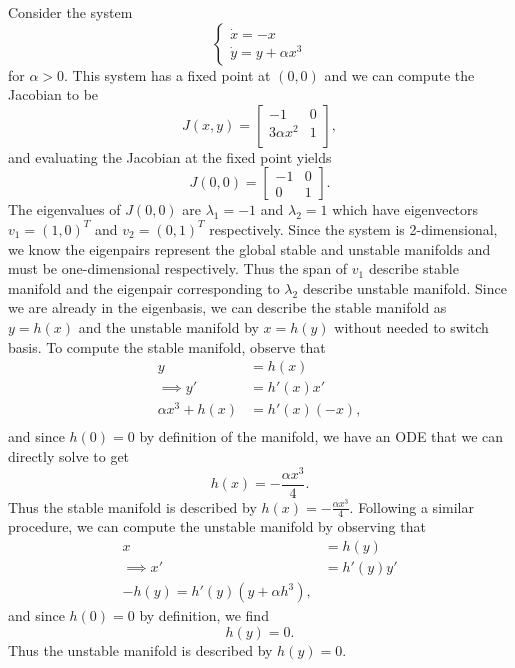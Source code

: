 \documentclass[12pt]{report}
\begin{document}
\begin{solution}

    \noindent
    Consider the system 
    \begin{equation}
        \left\{\begin{array}{l}
        \dot x= -x \\
        \dot y = y + \alpha x^3 
        \end{array}\right.
    \end{equation}
    for $\alpha>0$. This system has a fixed point at $(0,0)$ and we can compute the Jacobian to be
    \[ 
        J(x,y) = \begin{bmatrix}
            -1 & 0\\
            3\alpha x^2 & 1\\
        \end{bmatrix},
    \]
    and evaluating the Jacobian at the fixed point yields
    \[ 
        J(0,0) = \begin{bmatrix}
            -1 & 0 \\
            0 & 1
        \end{bmatrix}.
    \]
    The eigenvalues of $J(0,0)$ are $\lambda_1 = -1$ and $\lambda_2 = 1$ which have eigenvectors $v_1 = (1,0)^T$ and $v_2 = (0,1)^T$ respectively. Since the system is 2-dimensional, we know the eigenpairs represent the global stable and unstable manifolds and must be one-dimensional respectively. Thus the span of $v_1$ describe stable manifold and the eigenpair corresponding to $\lambda_2$ describe unstable manifold. Since we are already in the eigenbasis, we can describe the stable manifold as $y=h(x)$ and the unstable manifold by $x = h(y)$ without needed to switch basis. To compute the stable manifold, observe that
    \begin{align*}
        y &= h(x)\\
        \implies y' &= h'(x)x'\\
        \alpha x^3 + h(x) &= h'(x)(-x),\\
    \end{align*} 
    and since $h(0) = 0$ by definition of the manifold, we have an ODE that we can directly solve to get
    \[ 
        h(x) = - \frac{\alpha x^3}{4}.
    \]
    Thus the stable manifold is described by $h(x) = - \frac{\alpha x^3}{4}$. Following a similar procedure, we can compute the unstable manifold by observing that
    \begin{align*}
        x &= h(y)\\
        \implies x' &= h'(y)y'\\
        -h(y) = h'(y)(y + \alpha h^3),
    \end{align*}
    and since $h(0) = 0$ by definition, we find 
    \[ 
        h(y) = 0.
    \]
    Thus the unstable manifold is described by $h(y) = 0$. 

\end{solution}
\end{document}
